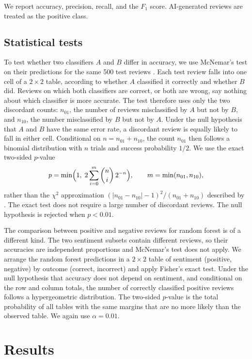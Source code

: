 \documentclass[onecolumn]{jmlr}
\begin{document}
We report accuracy, precision, recall, and the $F_1$ score. AI-generated reviews are treated as the positive class.

\subsection{Statistical tests}

To test whether two classifiers $A$ and $B$ differ in accuracy, we use McNemar's test on their predictions for the same 500 test reviews \citep{dietterich1998}. Each test review falls into one cell of a $2\times2$ table, according to whether $A$ classified it correctly and whether $B$ did. Reviews on which both classifiers are correct, or both are wrong, say nothing about which classifier is more accurate. The test therefore uses only the two discordant counts: $n_{01}$, the number of reviews misclassified by $A$ but not by $B$, and $n_{10}$, the number misclassified by $B$ but not by $A$. Under the null hypothesis that $A$ and $B$ have the same error rate, a discordant review is equally likely to fall in either cell. Conditional on $n=n_{01}+n_{10}$, the count $n_{01}$ then follows a binomial distribution with $n$ trials and success probability $1/2$. We use the exact two-sided $p$-value
\begin{equation*}
p = \min\Bigl(1,\; 2\sum_{i=0}^{m}\binom{n}{i}\,2^{-n}\Bigr), \qquad m=\min(n_{01},n_{10}),
\end{equation*}
rather than the $\chi^2$ approximation $(|n_{01}-n_{10}|-1)^2/(n_{01}+n_{10})$ described by \citet{dietterich1998}. The exact test does not require a large number of discordant reviews. The null hypothesis is rejected when $p<0.01$.

The comparison between positive and negative reviews for random forest is of a different kind. The two sentiment subsets contain different reviews, so their accuracies are independent proportions and McNemar's test does not apply. We arrange the random forest predictions in a $2\times2$ table of sentiment (positive, negative) by outcome (correct, incorrect) and apply Fisher's exact test. Under the null hypothesis that accuracy does not depend on sentiment, and conditional on the row and column totals, the number of correctly classified positive reviews follows a hypergeometric distribution. The two-sided $p$-value is the total probability of all tables with the same margins that are no more likely than the observed table. We again use $\alpha=0.01$.

\section{Results}
\end{document}

